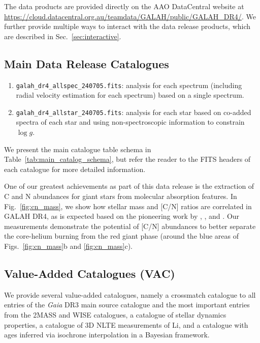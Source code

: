 \documentclass[
  journal=pasa,
  manuscript=research-paper, %
  year=2024,
  volume=37
]{cup-journal}
\newcommand{\logg}{$\log g$\xspace}
\newcommand{\Gaia}{\textit{Gaia}\xspace}
\begin{document}
The data products are provided directly on the AAO DataCentral website at \url{https://cloud.datacentral.org.au/teamdata/GALAH/public/GALAH_DR4/}. We further provide multiple ways to interact with the data release products, which are described in Sec.~\ref{sec:interactive}.

\subsection{Main Data Release Catalogues}
\label{sec:data_release_catalogues}

\begin{enumerate}
   \item \texttt{galah\_dr4\_allspec\_240705.fits}: analysis for each spectrum (including radial velocity estimation for each spectrum) based on a single spectrum.
   \item \texttt{galah\_dr4\_allstar\_240705.fits}: analysis for each star based on co-added spectra of each star and using non-spectroscopic information to constrain \logg.
\end{enumerate}

We present the main catalogue table schema in Table~\ref{tab:main_catalog_schema}, but refer the reader to the FITS headers of each catalogue for more detailed information.

One of our greatest achievements as part of this data release is the extraction of C and N abundances for giant stars from molecular absorption features. In Fig.~\ref{fig:cn_mass}, we show how stellar mass and [C/N] ratios are correlated in GALAH DR4, as is expected based on the pioneering work by \citet{Masseron2015}, \citet{Martig2016}, and \citet{Ness2016}. Our measurements demonstrate the potential of [C/N] abundances to better separate the core-helium burning from the red giant phase (around the blue areas of Figs.~\ref{fig:cn_mass}b and \ref{fig:cn_mass}c).

\subsection{Value-Added Catalogues (VAC)} \label{sec:vacs}

We provide several value-added catalogues, namely a crossmatch catalogue to all entries of the \Gaia DR3 main source catalogue and the most important entries from the 2MASS and WISE catalogues, a catalogue of stellar dynamics properties, a catalogue of 3D NLTE measurements of Li, and a catalogue with ages inferred via isochrone interpolation in a Bayesian framework.
\end{document}
